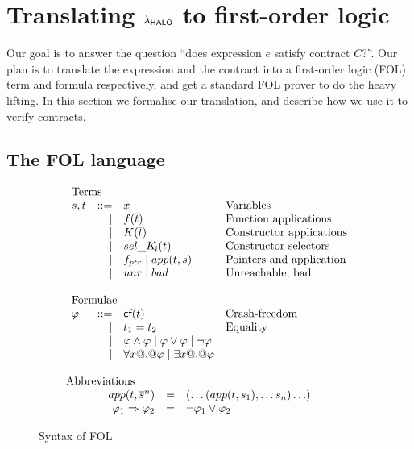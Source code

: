 \section{Translating $\lambda_{\sf HALO}$ to first-order logic} \label{ssect:trans-fol}

Our goal is to answer the question ``does expression $e$ satisfy
contract $C$?''.  Our plan is to translate the expression and the
contract into a first-order logic (FOL) term and formula respectively, and get a standard 
FOL prover to do the heavy lifting. In this section we formalise our translation, 
and describe how we use it to verify contracts.

\subsection{The FOL language}

\begin{figure}
\[\begin{array}{c}
\begin{array}{lrll}
\multicolumn{3}{l}{\text{Terms}} \\
  s,t & ::=  & x                          & \text{Variables} \\
      & \mid & f(\ol{t})                  & \text{Function applications} \\
      & \mid & K(\ol{t})                  & \text{Constructor applications} \\
      & \mid & \sel{K}{i}(t)              & \text{Constructor selectors} \\
      & \mid & f_{ptr} \mid app(t,s)       & \text{Pointers and application} \\
      & \mid & \unr \mid \bad             & \text{Unreachable, bad} \\ \\
\multicolumn{3}{l}{\text{Formulae}} \\
 \phi & ::=  & \lcf{t}    & \text{Crash-freedom} \\
      & \mid & t_1 = t_2  & \text{Equality} \\
      & \mid & \phi \land \phi \mid \phi \lor \phi \mid \neg \phi \\
      & \mid & \forall x @.@ \phi \mid \exists x @.@ \phi \\ \\
\end{array}
\\
\multicolumn{1}{l}{\text{Abbreviations}} \\
\begin{array}{rcl}
app(t,\oln{s}{n}) & = & (\ldots(app(t,s_1),\ldots s_n)\ldots) \\
\phi_1 \Rightarrow \phi_2 & = & \neg \phi_1 \lor \phi_2
\end{array}
\end{array}\]
\caption{Syntax of FOL}\label{fig:fol-image}
\end{figure}

